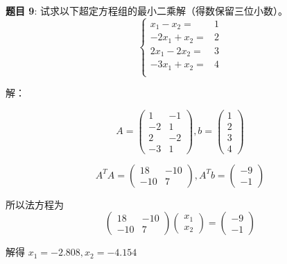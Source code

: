 \documentclass{article}
\begin{document}
\noindent\textbf{题目 9}: 试求以下超定方程组的最小二乘解（得数保留三位小数）。
$$
\left\{
\begin{aligned}
x_1 - x_2 =& 1 \\
-2x_1 + x_2 =& 2 \\
2x_1 - 2x_2 =& 3 \\
-3x_1 + x_2 =& 4 \\
\end{aligned}
\right.
$$

\noindent 解：

$$
A
=
\begin{pmatrix}
    1 & -1 \\
    -2 & 1 \\
    2 & -2 \\
    -3 & 1
\end{pmatrix}
,
b
=
\begin{pmatrix}
    1 \\
    2 \\
    3 \\
    4
\end{pmatrix}
$$

$$
A^TA
=
\begin{pmatrix}
    18 & -10 \\
    -10 & 7
\end{pmatrix}
,
A^Tb
=
\begin{pmatrix}
    -9 \\
    -1
\end{pmatrix}
$$

所以法方程为
$$
\begin{pmatrix}
    18 & -10 \\
    -10 & 7
\end{pmatrix}
\begin{pmatrix}
    x_1 \\
    x_2
\end{pmatrix}
=
\begin{pmatrix}
    -9 \\
    -1
\end{pmatrix}
$$

解得 $x_1 = -2.808, x_2 = -4.154$

\end{document}
